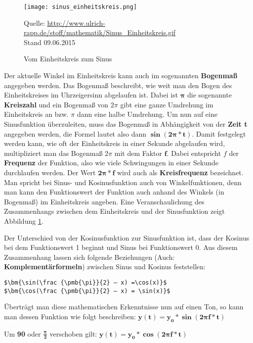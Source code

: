 \begin{figure} [ht]
\centering
\texttt{[image: sinus\_einheitskreis.png]}
\caption{Vom Einheitskreis zum Sinus}
\label{fig:unitcircleToSinus}
Quelle: \url{http://www.ulrich-rapp.de/stoff/mathematik/Sinus_Einheitskreis.gif}
\\Stand 09.06.2015
\end{figure}

Der aktuelle Winkel im Einheitskreis kann auch im sogenannten \textbf{Bogenmaß} angegeben werden. Das Bogenmaß beschreibt, wie weit man den Bogen des Einheitskreises im Uhrzeigersinn abgelaufen ist. Dabei ist $\bm{\pmb{\pi}}$ die sogenannte \textbf{Kreiszahl} und ein Bogenmaß von $2\pi$ gibt eine ganze Umdrehung im Einheitskreis an bzw. $\pi$ dann eine halbe Umdrehung. Um nun auf eine Sinusfunktion überzuleiten, muss das Bogenmaß in Abhängigkeit von der \textbf{Zeit t} angegeben werden, die Formel lautet also dann $\bm{\sin(2\pmb{\pi}*t)}$. Damit festgelegt werden kann, wie oft der Einheitskreis in einer Sekunde abgelaufen wird, multipliziert man das Bogenmaß $2\pi$ mit dem Faktor $\bm{f}$. Dabei entspricht $f$ der \textbf{Frequenz} der Funktion, also wie viele Schwingungen in einer Sekunde durchlaufen werden. Der Wert $\bm{2\pmb{\pi} * f}$ wird auch als \textbf{Kreisfrequenz} bezeichnet.
Man spricht bei Sinus- und Kosinusfunktion auch von Winkelfunktionen, denn man kann den Funktionswert der Funktion auch anhand des Winkels (in Bogenmaß) im Einheitskreis angeben. 
Eine Veranschaulichung des Zusammenhangs zwischen dem Einheitskreis und der Sinusfunktion zeigt Abbildung \ref{fig:unitcircleToSinus}.

Der Unterschied von der Kosinusfunktion zur Sinusfunktion ist, dass der Kosinus bei dem Funktionswert 1 beginnt und Sinus bei Funktionswert 0. Aus diesem Zusammenhang lassen sich folgende Beziehungen (Auch: \textbf{Komplementärformeln}) zwischen Sinus und Kosinus feststellen:\\

\begin{lstlisting}[mathescape]
$\bm{\sin(\frac {\pmb{\pi}}{2} – x) =\cos(x)}$
$\bm{\cos(\frac {\pmb{\pi}}{2} – x) = \sin(x)}$ 
\end{lstlisting}\cite[s. 218]{matheBuch}

Überträgt man diese mathematischen Erkenntnisse nun auf einen Ton, so kann man dessen Funktion wie folgt beschreiben: 		$\bm{y(t) = y_0 * \sin(2 \pmb{\pi} f * t)}$

Um \textbf{90\degree} oder $\bm{\frac{\pmb{\pi}}{2}}$ verschoben gilt: 		$\bm{y(t) = y_0*\cos(2 \pmb{\pi} f*t)}$

